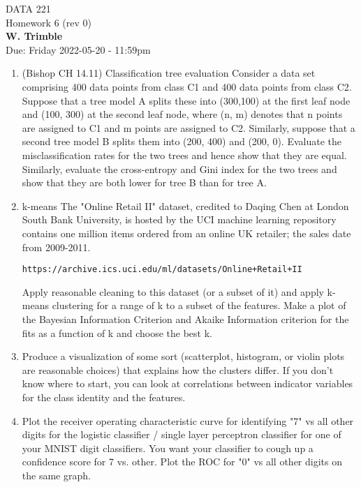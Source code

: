 \documentclass[12pt]{book}
\theoremstyle{definition}
\begin{document}
\begin{center}
{\Large DATA 221 \\  Homework 6  (rev 0)}\\
\textbf{W. Trimble}\\ %
Due: Friday 2022-05-20  - 11:59pm
\end{center}

\vspace{0.2 cm}

\begin{enumerate}

\item
(Bishop CH 14.11)  Classification tree evaluation
Consider a data set comprising 400 data points from class C1 and 400 data points from class C2. Suppose that a tree model A splits these into (300,100) at the first leaf node and (100, 300) at the second leaf node, where (n, m) denotes that n points are assigned to C1 and m points are assigned to C2. Similarly, suppose that a second tree model B splits them into (200, 400) and (200, 0). Evaluate the misclassification rates for the two trees and hence show that they are equal. Similarly, evaluate the cross-entropy and Gini index for the two trees and show that they are both lower for tree B than for tree A.

\item
k-means 
The "Online Retail II" dataset, credited to Daqing Chen at London South Bank University, is hosted by the UCI machine learning repository contains one million items ordered from an online UK retailer; the sales date from 2009-2011.

\texttt{https://archive.ics.uci.edu/ml/datasets/Online+Retail+II}

Apply reasonable cleaning to this dataset (or a subset of it) and apply k-means clustering for a range of k to a subset of the features. 
Make a plot of the Bayesian Information Criterion and Akaike Information criterion for the fits as a function of k and choose the best k.

\item
Produce a visualization of some sort (scatterplot, histogram, or violin plots are reasonable choices) that explains how the clusters differ.  If you don't know where to start, you can look at correlations between indicator variables for the class identity and the features.   

\item
Plot the receiver operating characteristic curve for identifying "7" vs all other digits for the logistic classifier / single layer perceptron classifier for one of your MNIST digit classifiers.    You want your classifier to cough up a confidence score for 7 vs. other.     Plot the ROC for "0" vs all other digits on the same graph.  
\end{enumerate}
\end{document}
